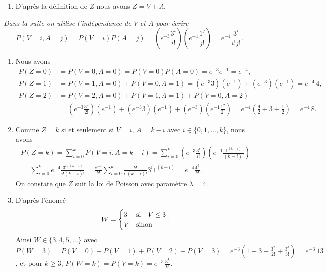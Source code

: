\documentclass[12pt,reqno]{amsart}
\begin{document}
\begin{solution}
  \begin{enumerate}
    \item D'après la définition de $Z$ nous avons $Z = V + A$.
  \end{enumerate}
  \emph{Dans la suite on utilise l'indépendance de $V$ et $A$ pour écrire
    $$
      P(V=i, A=j) = P(V=i)P(A=j) = (e^{-3}\frac{3^{i}}{i!})(e^{-1}\frac{1^{j}}{j!}) = e^{-4}\frac{3^{i}}{i!j!}.
    $$}
  \begin{enumerate}[resume]
    \item Nous avons
    \begin{align*}
      P(Z=0) &= P(V=0, A=0) = P(V=0)P(A=0) = e^{-3}e^{-1}=e^{-4},\\
      P(Z=1) &= P(V=1, A=0) + P(V=0, A=1) = (e^{-3}3)(e^{-1})+(e^{-3})(e^{-1})=e^{-4}\,4,\\
      P(Z=2) &= P(V=2, A=0) + P(V=1, A=1) + P(V=0, A=2)\\
             &= (e^{-3}\frac{3^{2}}{2!})(e^{-1})+(e^{-3}3)(e^{-1})+(e^{-3})(e^{-1}\frac{1^{2}}{2!})=e^{-4}(\frac{9}{2}+3+\frac{1}{2})=e^{-4}\,8.
    \end{align*}
    \item Comme $Z=k$ si et seulement si $V=i$, $A=k-i$ avec $i \in \{0,1,\ldots,k\}$, nous avons
    \begin{multline*}
      P(Z=k) = \sum_{i=0}^k P(V=i, A=k-i)
        = \sum_{i=0}^k \left(e^{-3}\frac{3^{i}}{i!}\right)\left(e^{-1}\frac{1^{(k-i)}}{(k-i)!}\right) \\
        = \sum_{i=0}^k e^{-4}\frac{3^{i}1^{(k-i)}}{i!(k-i)!}
        = \frac{e^{-4}}{k!} \sum_{i=0}^k \frac{k!}{i!(k-i)!}3^{i}1^{(k-i)} = e^{-4}\frac{4^k}{k!}.
    \end{multline*}
    On constate que $Z$ suit la loi de Poisson avec paramètre $\lambda = 4$.
    \item D'après l'énoncé
    $$
      W = \begin{cases}
        3 & \text{si\quad} V \leq 3\\
        V & \text{sinon}
      \end{cases}.
    $$
    Ainsi $W \in \{3,4,5,\ldots\}$ avec $P(W=3) = P(V=0)+P(V=1)+P(V=2)+P(V=3) = e^{-3}\left( 1+3+\frac{3^{2}}{2!} + \frac{3^{3}}{3!}\right) = e^{-3}\,13$, et pour $k \geq 3$, $P(W=k) = P(V=k) = e^{-3}\,\frac{3^{k}}{k!}$.
  \end{enumerate}
\end{solution}
\end{document}
